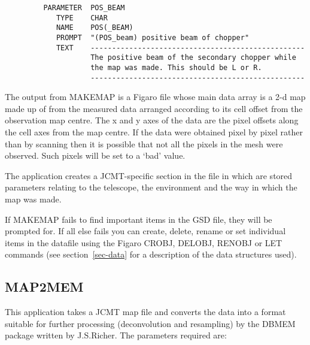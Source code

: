 \begin{small}
\begin{verbatim}
         PARAMETER  POS_BEAM
            TYPE    CHAR
            NAME    POS(_BEAM)
            PROMPT  "(POS_beam) positive beam of chopper"
            TEXT    --------------------------------------------------
                    The positive beam of the secondary chopper while
                    the map was made. This should be L or R.
                    --------------------------------------------------
\end{verbatim}
\end{small}

The output from MAKEMAP is a Figaro file whose main data array is a
2-d map made up of from the measured data arranged according to its
cell offset from the observation map centre. The x and y axes of the
data are the pixel offsets along the cell axes from the map centre. If
the data were obtained pixel by pixel rather than by scanning then it
is possible that not all the pixels in the mesh were observed. Such
pixels will be set to a `bad' value.

The application creates a JCMT-specific section in the file in which
are stored parameters relating to the telescope, the environment and
the way in which the map was made. 

If MAKEMAP fails to find important items in the GSD file, they will be 
prompted for. If all else fails you can create, delete, rename or set
individual items in the datafile using the Figaro CROBJ, DELOBJ, 
RENOBJ or LET commands (see section~\ref{sec-data} for a description
of the data structures used).

\subsection {MAP2MEM}

This application takes a JCMT map file and converts the data into a
format suitable for further processing (deconvolution and resampling)
by the  DBMEM package written by J.S.Richer. The parameters required
are:

